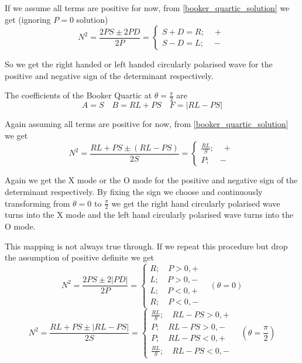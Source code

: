 \documentclass[12pt, twoside]{article}
\begin{document}
	If we assume all terms are positive for now, from \eqref{booker_quartic_solution} we get (ignoring $P=0$ solution)
	\begin{equation}
		N^2 = \frac{2PS\pm2PD}{2P} = \begin{cases}
			S + D = R; \quad + \\ S - D = L; \quad -
		\end{cases}
	\end{equation}
	
	So we get the right handed or left handed circularly polarised wave for the positive and negative sign of the determinant respectively.
	
	The coefficients of the Booker Quartic at $\theta=\frac{\pi}{2}$ are
	\begin{equation}
		A = S \quad B = RL+PS \quad F = \left|RL-PS\right|
	\end{equation}
	
	Again assuming all terms are positive for now, from \eqref{booker_quartic_solution} we get
	\begin{equation}
		N^2 = \frac{RL+PS\pm \left(RL-PS\right)}{2S} = \begin{cases}
			\frac{RL}{S}; \quad + \\ P; \quad -
		\end{cases}
	\end{equation}

	Again we get the X mode or the O mode for the positive and negative sign of the determinant respectively. By fixing the sign we choose and continuously transforming from $\theta = 0$ to $\frac{\pi}{2}$ we get the right hand circularly polarised wave turns into the X mode and the left hand circularly polarised wave turns into the O mode.
	
	This mapping is not always true through. If we repeat this procedure but drop the assumption of positive definite we get
	\begin{equation}
		N^2 = \frac{2PS \pm 2\left|PD\right|}{2P} = \begin{cases}
			R; \quad P > 0, + \\ L; \quad P > 0, - \\
			L; \quad P < 0, + \\ R; \quad P < 0, -
		\end{cases} \quad \left(\theta=0\right)
	\end{equation}
	\begin{equation}
	N^2 = \frac{RL+PS \pm \left|RL-PS\right|}{2S} = \begin{cases}
		\frac{RL}{S}; \quad RL-PS > 0, + \\ P; \quad RL-PS > 0, - \\
		P; \quad RL-PS < 0, + \\ \frac{RL}{S}; \quad RL-PS < 0, -
	\end{cases} \quad \left(\theta=\frac{\pi}{2}\right)
	\end{equation}
\end{document}
